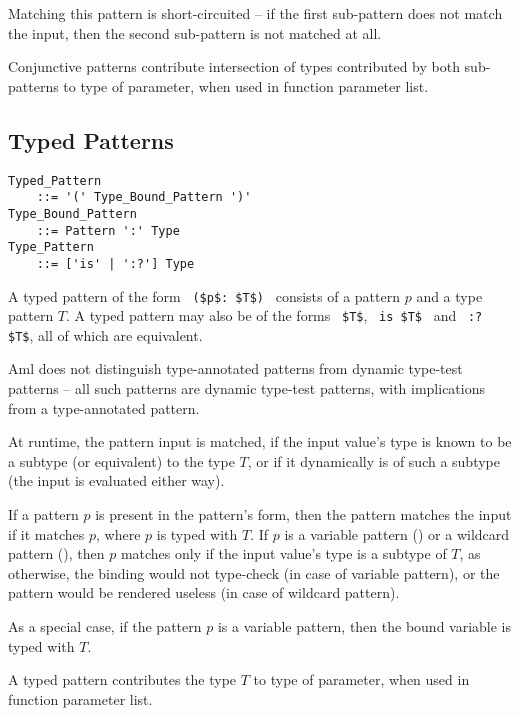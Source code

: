 Matching this pattern is short-circuited -- if the first sub-pattern does not match the input, then the second sub-pattern is not matched at all. 

Conjunctive patterns contribute intersection of types contributed by both sub-patterns to type of parameter, when used in function parameter list. 





\subsection{Typed Patterns}
\label{sec:typed-patterns}

\grammar\begin{lstlisting}
Typed_Pattern 
    ::= '(' Type_Bound_Pattern ')'
Type_Bound_Pattern 
    ::= Pattern ':' Type
Type_Pattern 
    ::= ['is' | ':?'] Type
\end{lstlisting}

A typed pattern of the form ~\lstinline!($p$: $T$)!~ consists of a pattern $p$ and a type pattern $T$. A typed pattern may also be of the forms ~\lstinline!$T$!, ~\lstinline!is $T$!~ and
~\lstinline!:? $T$!, all of which are equivalent. 

Aml does not distinguish type-annotated patterns from dynamic type-test patterns -- all such patterns are dynamic type-test patterns, with implications from a type-annotated pattern. 

At runtime, the pattern input is matched, if the input value's type is known to be a subtype (or equivalent) to the type $T$, or if it dynamically is of such a subtype (the input is evaluated either way). 

If a pattern $p$ is present in the pattern's form, then the pattern matches the input if it matches $p$, where $p$ is typed with $T$. If $p$ is a variable pattern () or a wildcard pattern (), then $p$ matches only if the input value's type is a subtype of $T$, as otherwise, the binding would not type-check (in case of variable pattern), or the pattern would be rendered useless (in case of wildcard pattern). 

As a special case, if the pattern $p$ is a variable pattern, then the bound variable is typed with $T$. 

A typed pattern contributes the type $T$ to type of parameter, when used in function parameter list. 





